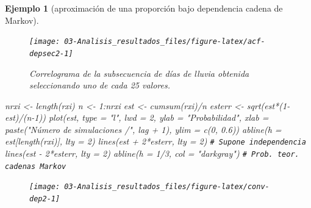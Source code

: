 \documentclass[
  10pt,
]{book}
\newenvironment{Shaded}{\begin{snugshade}}{\end{snugshade}}
\newcommand{\AttributeTok}[1]{\textcolor[rgb]{0.77,0.63,0.00}{#1}}
\newcommand{\CommentTok}[1]{\textcolor[rgb]{0.56,0.35,0.01}{\textit{#1}}}
\newcommand{\DecValTok}[1]{\textcolor[rgb]{0.00,0.00,0.81}{#1}}
\newcommand{\FloatTok}[1]{\textcolor[rgb]{0.00,0.00,0.81}{#1}}
\newcommand{\FunctionTok}[1]{\textcolor[rgb]{0.00,0.00,0.00}{#1}}
\newcommand{\NormalTok}[1]{#1}
\newcommand{\OtherTok}[1]{\textcolor[rgb]{0.56,0.35,0.01}{#1}}
\newcommand{\SpecialCharTok}[1]{\textcolor[rgb]{0.00,0.00,0.00}{#1}}
\newcommand{\StringTok}[1]{\textcolor[rgb]{0.31,0.60,0.02}{#1}}
\theoremstyle{break}
\newtheorem{example}{Ejemplo}[chapter]
\theoremstyle{nonumberplain}
\renewcommand{\CommentTok}[1]{\textcolor[rgb]{0.41,0.41,0.41}{\texttt{#1}}}
\begin{document}
\begin{example}[aproximación de una proporción bajo dependencia cadena de Markov]
\begin{figure}[!htbp]
{\centering \texttt{[image: 03-Analisis\_resultados\_files/figure-latex/acf-depsec2-1]} 

}

\caption{Correlograma de la subsecuencia de días de lluvia obtenida seleccionando uno de cada 25 valores.}\label{fig:acf-depsec2}
\end{figure}

\begin{Shaded}
\begin{Highlighting}[]
\NormalTok{nrxi }\OtherTok{\textless{}{-}} \FunctionTok{length}\NormalTok{(rxi)}
\NormalTok{n }\OtherTok{\textless{}{-}} \DecValTok{1}\SpecialCharTok{:}\NormalTok{nrxi}
\NormalTok{est }\OtherTok{\textless{}{-}} \FunctionTok{cumsum}\NormalTok{(rxi)}\SpecialCharTok{/}\NormalTok{n}
\NormalTok{esterr }\OtherTok{\textless{}{-}} \FunctionTok{sqrt}\NormalTok{(est}\SpecialCharTok{*}\NormalTok{(}\DecValTok{1}\SpecialCharTok{{-}}\NormalTok{est)}\SpecialCharTok{/}\NormalTok{(n}\DecValTok{{-}1}\NormalTok{))}
\FunctionTok{plot}\NormalTok{(est, }\AttributeTok{type =} \StringTok{"l"}\NormalTok{, }\AttributeTok{lwd =} \DecValTok{2}\NormalTok{, }\AttributeTok{ylab =} \StringTok{"Probabilidad"}\NormalTok{,  }
     \AttributeTok{xlab =} \FunctionTok{paste}\NormalTok{(}\StringTok{"Número de simulaciones /"}\NormalTok{, lag }\SpecialCharTok{+} \DecValTok{1}\NormalTok{), }\AttributeTok{ylim =} \FunctionTok{c}\NormalTok{(}\DecValTok{0}\NormalTok{, }\FloatTok{0.6}\NormalTok{))}
\FunctionTok{abline}\NormalTok{(}\AttributeTok{h =}\NormalTok{ est[}\FunctionTok{length}\NormalTok{(rxi)], }\AttributeTok{lty =} \DecValTok{2}\NormalTok{)}
\FunctionTok{lines}\NormalTok{(est }\SpecialCharTok{+} \DecValTok{2}\SpecialCharTok{*}\NormalTok{esterr, }\AttributeTok{lty =} \DecValTok{2}\NormalTok{) }\CommentTok{\# Supone independencia}
\FunctionTok{lines}\NormalTok{(est }\SpecialCharTok{{-}} \DecValTok{2}\SpecialCharTok{*}\NormalTok{esterr, }\AttributeTok{lty =} \DecValTok{2}\NormalTok{)}
\FunctionTok{abline}\NormalTok{(}\AttributeTok{h =} \DecValTok{1}\SpecialCharTok{/}\DecValTok{3}\NormalTok{, }\AttributeTok{col =} \StringTok{"darkgray"}\NormalTok{)     }\CommentTok{\# Prob. teor. cadenas Markov}
\end{Highlighting}
\end{Shaded}

\begin{figure}[!htbp]

{\centering \texttt{[image: 03-Analisis\_resultados\_files/figure-latex/conv-dep2-1]} 

}


\end{figure}
\end{example}
\end{document}
